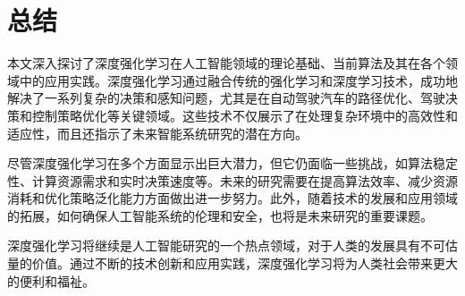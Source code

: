 \section{总结}\label{sec:conclusion}

本文深入探讨了深度强化学习在人工智能领域的理论基础、当前算法及其在各个领域中的应用实践。深度强化学习通过融合传统的强化学习和深度学习技术，成功地解决了一系列复杂的决策和感知问题，尤其是在自动驾驶汽车的路径优化、驾驶决策和控制策略优化等关键领域。这些技术不仅展示了在处理复杂环境中的高效性和适应性，而且还指示了未来智能系统研究的潜在方向。

尽管深度强化学习在多个方面显示出巨大潜力，但它仍面临一些挑战，如算法稳定性、计算资源需求和实时决策速度等。未来的研究需要在提高算法效率、减少资源消耗和优化策略泛化能力方面做出进一步努力。此外，随着技术的发展和应用领域的拓展，如何确保人工智能系统的伦理和安全，也将是未来研究的重要课题。

深度强化学习将继续是人工智能研究的一个热点领域，对于人类的发展具有不可估量的价值。通过不断的技术创新和应用实践，深度强化学习将为人类社会带来更大的便利和福祉。
